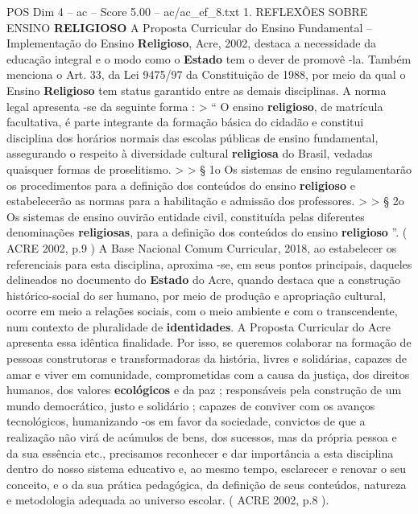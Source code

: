 \begin{textsample}{POS Dim 4 – ac – Score 5.00 – ac/ac\_ef\_8.txt}  \label{ex:f4_pos_250}
1.
REFLEXÕES SOBRE ENSINO \textbf{RELIGIOSO} A Proposta Curricular do Ensino Fundamental – Implementação do Ensino \textbf{Religioso}, Acre, 2002, destaca a necessidade da educação integral e o modo como o \textbf{Estado} tem o dever de promovê -la.
Também menciona o Art. 33, da Lei 9475/97 da Constituição de 1988, por meio da qual o Ensino \textbf{Religioso} tem status garantido entre as demais disciplinas.
A norma legal apresenta -se da seguinte forma : > “ O ensino \textbf{religioso}, de matrícula facultativa, é parte integrante da formação básica do cidadão e constitui disciplina dos horários normais das escolas públicas de ensino fundamental, assegurando o respeito à diversidade cultural \textbf{religiosa} do Brasil, vedadas quaisquer formas de proselitismo. > > § 1o Os sistemas de ensino regulamentarão os procedimentos para a definição dos conteúdos do ensino \textbf{religioso} e estabelecerão as normas para a habilitação e admissão dos professores. > > § 2o Os sistemas de ensino ouvirão entidade civil, constituída pelas diferentes denominações \textbf{religiosas}, para a definição dos conteúdos do ensino \textbf{religioso} ”. ( ACRE 2002, p.9 ) A Base Nacional Comum Curricular, 2018, ao estabelecer os referenciais para esta disciplina, aproxima -se, em seus pontos principais, daqueles delineados no documento do \textbf{Estado} do Acre, quando destaca que a construção histórico-social do ser humano, por meio de produção e apropriação cultural, ocorre em meio a relações sociais, com o meio ambiente e com o transcendente, num contexto de pluralidade de \textbf{identidades}.
A Proposta Curricular do Acre apresenta essa idêntica finalidade.
Por isso, se queremos colaborar na formação de pessoas construtoras e transformadoras da história, livres e solidárias, capazes de amar e viver em comunidade, comprometidas com a causa da justiça, dos direitos humanos, dos valores \textbf{ecológicos} e da paz ; responsáveis pela construção de um mundo democrático, justo e solidário ; capazes de conviver com os avanços tecnológicos, humanizando -os em favor da sociedade, convictos de que a realização não virá de acúmulos de bens, dos sucessos, mas da própria pessoa e da sua essência etc., precisamos reconhecer e dar importância a esta disciplina dentro do nosso sistema educativo e, ao mesmo tempo, esclarecer e renovar o seu conceito, e o da sua prática pedagógica, da definição de seus conteúdos, natureza e metodologia adequada ao universo escolar. ( ACRE 2002, p.8 ).

\end{textsample}
